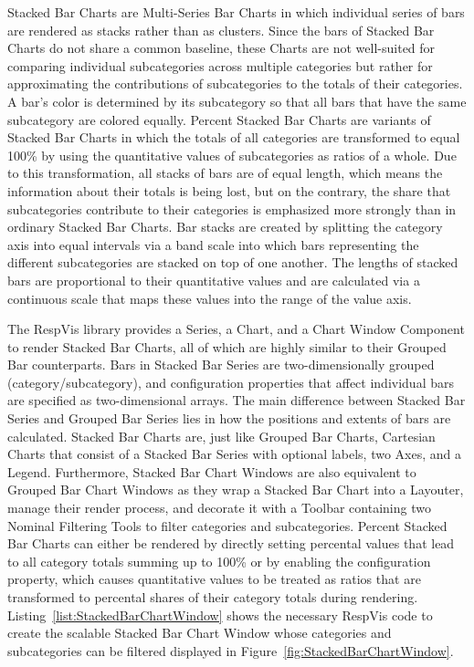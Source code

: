 Stacked Bar Charts are Multi-Series Bar Charts in which individual
series of bars are rendered as stacks rather than as clusters.  Since
the bars of Stacked Bar Charts do not share a common baseline, these
Charts are not well-suited for comparing individual subcategories
across multiple categories but rather for approximating the
contributions of subcategories to the totals of their categories.  A
bar's color is determined by its subcategory so that all bars that
have the same subcategory are colored equally.  Percent Stacked Bar
Charts are variants of Stacked Bar Charts in which the totals of all
categories are transformed to equal 100\% by using the quantitative
values of subcategories as ratios of a whole.  Due to this
transformation, all stacks of bars are of equal length, which means
the information about their totals is being lost, but on the contrary,
the share that subcategories contribute to their categories is
emphasized more strongly than in ordinary Stacked Bar Charts.  Bar
stacks are created by splitting the category axis into equal intervals
via a band scale into which bars representing the different
subcategories are stacked on top of one another.  The lengths of
stacked bars are proportional to their quantitative values and are
calculated via a continuous scale that maps these values into the
range of the value axis.

The RespVis library provides a Series, a Chart, and a Chart Window
Component to render Stacked Bar Charts, all of which are highly
similar to their Grouped Bar counterparts.  Bars in Stacked Bar Series
are two-dimensionally grouped (category/subcategory), and
configuration properties that affect individual bars are specified as
two-dimensional arrays.  The main difference between Stacked Bar
Series and Grouped Bar Series lies in how the positions and extents of
bars are calculated.  Stacked Bar Charts are, just like Grouped Bar
Charts, Cartesian Charts that consist of a Stacked Bar Series with
optional labels, two Axes, and a Legend.  Furthermore, Stacked Bar
Chart Windows are also equivalent to Grouped Bar Chart Windows as they
wrap a Stacked Bar Chart into a Layouter, manage their render process,
and decorate it with a Toolbar containing two Nominal Filtering Tools
to filter categories and subcategories.  Percent Stacked Bar Charts
can either be rendered by directly setting percental values that lead
to all category totals summing up to 100\% or by enabling the
 configuration property, which causes
quantitative values to be treated as ratios that are transformed to
percental shares of their category totals during rendering.
Listing~\ref{list:StackedBarChartWindow} shows the necessary RespVis
code to create the scalable Stacked Bar Chart Window whose categories
and subcategories can be filtered displayed in
Figure~\ref{fig:StackedBarChartWindow}.
 

